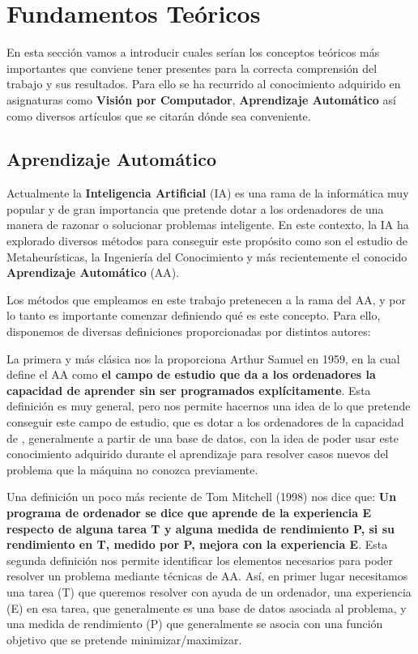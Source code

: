 
\chapter{Fundamentos Teóricos}

En esta sección vamos a introducir cuales serían los conceptos teóricos más importantes que conviene tener presentes para la correcta comprensión del trabajo y sus resultados. Para ello se ha recurrido al conocimiento adquirido en asignaturas como \textbf{Visión por Computador}, \textbf{Aprendizaje Automático} así como diversos artículos que se citarán dónde sea conveniente.

\section{Aprendizaje Automático}
    \noindent Actualmente la \textbf{Inteligencia Artificial} (IA) es una rama de la informática muy popular y de gran importancia que pretende dotar a los ordenadores de una manera de razonar o solucionar problemas inteligente. En este contexto, la IA ha explorado diversos métodos para conseguir este propósito como son el estudio de Metaheurísticas, la Ingeniería del Conocimiento y más recientemente el conocido \textbf{Aprendizaje Automático} (AA). 
    
    \medskip

    \noindent Los métodos que empleamos en este trabajo pretenecen a la rama del AA, y por lo tanto es importante comenzar definiendo qué es este concepto. Para ello, disponemos de diversas definiciones proporcionadas por distintos autores: 

    \medskip

    \noindent La primera y más clásica nos la proporciona Arthur Samuel en 1959, en la cual define el AA como \textbf{el campo de estudio que da a los ordenadores la capacidad de aprender sin ser programados explícitamente}. Esta definición es muy general, pero nos permite hacernos una idea de lo que pretende conseguir este campo de estudio, que es dotar a los ordenadores de la capacidad de , generalmente a partir de una base de datos, con la idea de poder usar este conocimiento adquirido durante el aprendizaje para resolver casos nuevos del problema que la máquina no conozca previamente.
    
    \medskip

    \noindent Una definición un poco más reciente de Tom Mitchell (1998) nos dice que: \textbf{Un programa de ordenador se dice que aprende de la experiencia E respecto de alguna tarea T y alguna medida de rendimiento P, si su rendimiento en T, medido por P, mejora con la experiencia E}. Esta segunda definición nos permite identificar los elementos necesarios para poder resolver un problema mediante técnicas de AA. Así, en primer lugar necesitamos una tarea (T) que queremos resolver con ayuda de un ordenador, una experiencia (E) en esa tarea, que generalmente es una base de datos asociada al problema, y una medida de rendimiento (P) que generalmente se asocia con una función objetivo que se pretende minimizar/maximizar.

